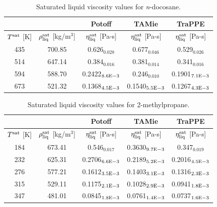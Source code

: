 \documentclass[preprint,review,12pt]{elsarticle}
\begin{document}
	\begin{table}[H]
		\caption{Saturated liquid viscosity values for \textit{n}-docosane.}
		\begin{center}
			\begin{tabular}{|c|c|c|c|c|}
				\hline
				&                                       & Potoff            & TAMie             & TraPPE            \\ \hline
				$T^{\rm sat}$ {[}K{]} & $\rho^{\rm sat}_{\rm liq}$ [kg/m$^3$] & $\eta_{\rm liq}^{\rm sat}$ {[}Pa-s{]} & $\eta_{\rm liq}^{\rm sat}$ {[}Pa-s{]} & $\eta_{\rm liq}^{\rm sat}$ {[}Pa-s{]} \\ \hline
				435 & 700.85 & 0.626$_{0.028}$   & 0.677$_{0.046}$   & 0.529$_{0.026}$   \\ \hline
				514 & 647.14 & 0.384$_{0.016}$   & 0.381$_{0.014}$   & 0.341$_{0.016}$   \\ \hline
				594 & 588.70 & 0.2422$_{8.6 \rm E-3}$ & 0.246$_{0.010}$   & 0.1901$_{7.1 \rm E-3}$ \\ \hline
				673 & 521.32 & 0.1368$_{4.5 \rm E-3}$ & 0.1540$_{5.5 \rm E-3}$ & 0.1267$_{4.3 \rm E-3}$ \\ \hline
			\end{tabular}
		\end{center}
	\end{table}
	
	\begin{table}[H]
		\caption{Saturated liquid viscosity values for 2-methylpropane.}
		\begin{center}
			\begin{tabular}{|c|c|c|c|c|}
				\hline
				&                                       & Potoff            & TAMie             & TraPPE            \\ \hline
				$T^{\rm sat}$ {[}K{]} & $\rho^{\rm sat}_{\rm liq}$ [kg/m$^3$] & $\eta_{\rm liq}^{\rm sat}$ {[}Pa-s{]} & $\eta_{\rm liq}^{\rm sat}$ {[}Pa-s{]} & $\eta_{\rm liq}^{\rm sat}$ {[}Pa-s{]} \\ \hline
				184 & 673.41 & 0.546$_{0.017}$   & 0.3630$_{9.7 \rm E-3}$ & 0.347$_{0.019}$   \\ \hline
				232 & 625.31 & 0.2706$_{6.6 \rm E-3}$ & 0.2189$_{5.2 \rm E-3}$ & 0.2016$_{4.5 \rm E-3}$ \\ \hline
				276 & 577.21 & 0.1612$_{3.5 \rm E-3}$ & 0.1403$_{3.1 \rm E-3}$ & 0.1316$_{2.3 \rm E-3}$ \\ \hline
				315 & 529.11 & 0.1175$_{2.1 \rm E-3}$ & 0.1028$_{2.9 \rm E-3}$ & 0.0941$_{1.8 \rm E-3}$ \\ \hline
				347 & 481.01 & 0.0845$_{1.8 \rm E-3}$ & 0.0761$_{1.4 \rm E-3}$ & 0.0737$_{1.6 \rm E-3}$ \\ \hline
			\end{tabular}
		\end{center}
	\end{table}
	
\end{document}
